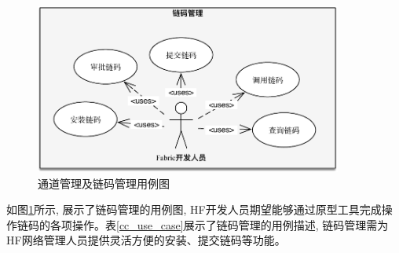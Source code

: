 \begin{figure}[!htbp] %
    \centering %
    \includegraphics[width=0.9\textwidth]{FIGs/chapter4/cc_use_case.pdf} %
    \caption{通道管理及链码管理用例图} %
    \label{cc_use_case_pic} %
\end{figure}%

如图\ref{cc_use_case_pic}所示, 展示了链码管理的用例图, HF开发人员期望能够通过原型工具完成操作链码的各项操作。表\ref{cc_use_case}展示了链码管理的用例描述, 链码管理需为HF网络管理人员提供灵活方便的安装、提交链码等功能。

